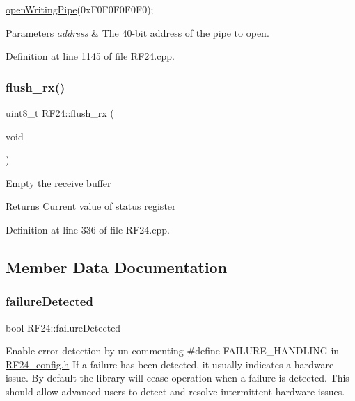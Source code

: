 \begin{DoxyCode}
\hyperlink{classRF24_af2e409e62d49a23e372a70b904ae30e1}{openWritingPipe}(0xF0F0F0F0F0);
\end{DoxyCode}



\begin{DoxyParams}{Parameters}
{\em address} & The 40-\/bit address of the pipe to open. \\
\hline
\end{DoxyParams}


Definition at line 1145 of file R\+F24.\+cpp.

\mbox{\label{classRF24_a575c061519e7820e1850ad380c617d95}} 
\subsubsection{\texorpdfstring{flush\+\_\+rx()}{flush\_rx()}}
{\footnotesize\ttfamily uint8\+\_\+t R\+F24\+::flush\+\_\+rx (\begin{DoxyParamCaption}\item[{void}]{ }\end{DoxyParamCaption})}

Empty the receive buffer

\begin{DoxyReturn}{Returns}
Current value of status register 
\end{DoxyReturn}


Definition at line 336 of file R\+F24.\+cpp.



\subsection{Member Data Documentation}
\mbox{\label{classRF24_a2e40fe66d1231a333aa2534e8491f828}} 
\subsubsection{\texorpdfstring{failure\+Detected}{failureDetected}}
{\footnotesize\ttfamily bool R\+F24\+::failure\+Detected}

Enable error detection by un-\/commenting \#define F\+A\+I\+L\+U\+R\+E\+\_\+\+H\+A\+N\+D\+L\+I\+NG in \hyperlink{RF24__config_8h}{R\+F24\+\_\+config.\+h} If a failure has been detected, it usually indicates a hardware issue. By default the library will cease operation when a failure is detected. This should allow advanced users to detect and resolve intermittent hardware issues.

